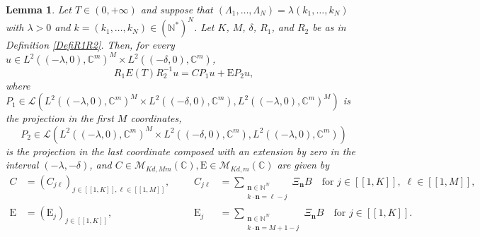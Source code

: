 \documentclass[10pt]{amsart}
\newcommand{\bn}{\boldsymbol{n}}
\newcommand{\llbracket}{[\![}
\newcommand{\rrbracket}{]\!]}
\theoremstyle{plain}
\newtheorem{lemm}[theo]{Lemma}
\theoremstyle{definition}
\newcommand{\Epsilon}{\mathrm E}
\begin{document}
\begin{lemm}
\label{LemmMatrixET}
Let $T \in (0, +\infty)$ and suppose that $(\Lambda_1, \dots, \Lambda_N) = \lambda (k_1, \dots, k_N)$ with $\lambda > 0$ and $k = (k_1, \dots, k_N) \in (\mathbb N^\ast)^N$. Let $K$, $M$, $\delta$, $R_1$, and $R_2$ be as in Definition \ref{DefiR1R2}. Then, for every $u \in L^2((-\lambda, 0), \mathbb C^m)^M \times L^2((-\delta, 0), \mathbb C^m)$,\vspace*{-3pt}
\[
R_1 E(T) R_2^{-1} u = C P_1 u + \Epsilon P_2 u,
\]
where $P_1 \in \mathcal L\left(L^2((-\lambda, 0), \mathbb C^m)^M \times L^2((-\delta, 0), \mathbb C^m), L^2((-\lambda, 0), \mathbb C^m)^M\right)$
is the projection in the first $M$ coordinates,\vspace*{-3pt}
\[
P_2 \in \mathcal L\left(L^2((-\lambda, 0), \mathbb C^m)^M \times L^2((-\delta, 0), \mathbb C^m), L^2((-\lambda, 0), \mathbb C^m)\right)
\]
is the projection in the last coordinate composed with an extension by zero in the interval $(-\lambda, -\delta)$, and $C \in \mathcal M_{K d, M m}(\mathbb C), \Epsilon \in \mathcal M_{K d, m}(\mathbb C)$ are given by
\begin{equation}
\label{DefCEps}
\begin{aligned}
C & = \left(C_{j\ell}\right)_{j \in \llbracket 1, K\rrbracket, \ell \in \llbracket 1, M\rrbracket}, & & & C_{j\ell} & = \sum_{\substack{\bn \in \mathbb N^N \\ k \cdot \bn = \ell - j}} \Xi_{\bn} B\quad \text{for } j \in \llbracket 1, K\rrbracket,\; \ell \in \llbracket 1, M\rrbracket, \\
\Epsilon & = \left(\Epsilon_j\right)_{j \in \llbracket 1, K\rrbracket}, & & & \Epsilon_j & = \sum_{\substack{\bn \in \mathbb N^N \\ k \cdot \bn = M+1 - j}} \Xi_{\bn} B \quad\text{for } j \in \llbracket 1, K\rrbracket.
\end{aligned}
\end{equation}
\end{lemm}
\end{document}

